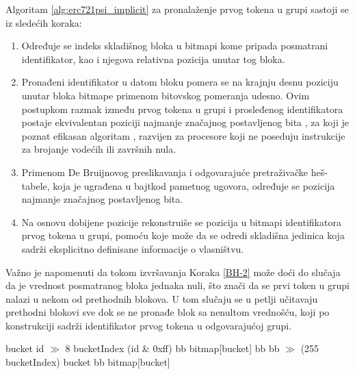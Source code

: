 Algoritam \ref{alg:erc721psi_implicit} za pronalaženje prvog tokena u grupi sastoji se iz sledećih koraka:
\begin{enumerate}
\item Određuje se indeks skladišnog bloka u bitmapi kome pripada posmatrani identifikator, kao i njegova relativna pozicija unutar tog bloka.
\item \label{BH-2} Pronađeni identifikator u datom bloku pomera se na krajnju desnu poziciju unutar bloka bitmape primenom bitovskog pomeranja udesno. Ovim postupkom razmak između prvog tokena u grupi i prosleđenog identifikatora postaje ekvivalentan poziciji najmanje značajnog postavljenog bita , za koji je poznat efikasan algoritam \cite{leiserson1998using}, razvijen za procesore koji ne poseduju instrukcije za brojanje vodećih ili završnih nula.
\item Primenom De Bruijnovog preslikavanja i odgovarajuće pretraživačke heš-tabele, koja je ugrađena u bajtkod pametnog ugovora, određuje se pozicija najmanje značajnog postavljenog bita.
\item Na osnovu dobijene pozicije rekonstruiše se pozicija u bitmapi identifikatora prvog tokena u grupi, pomoću koje može da se odredi skladišna jedinica koja sadrži eksplicitno definisane informacije o vlasništvu.
\end{enumerate}

Važno je napomenuti da tokom izvršavanja Koraka \ref{BH-2} može doći do slučaja da je vrednost posmatranog bloka jednaka nuli, što znači da se prvi token u grupi nalazi u nekom od prethodnih blokova. U tom slučaju se u petlji učitavaju prethodni blokovi sve dok se ne pronađe blok sa nenultom vrednošću, koji po konstrukciji sadrži identifikator prvog tokena u odgovarajućoj grupi.

\begin{algorithm}
\caption{Algoritam za pronalaženje implicitnog vlasništva u ERC-721Psi standardu}
\label{alg:erc721psi_implicit}
\begin{algorithmic}[1]
    \State bucket \Eq id $\gg$ 8
    \State bucketIndex \Eq (id \& 0xff)
    \State bb \Eq bitmap[bucket]\coldSLOAD
    \State bb \Eq bb $\gg$ (255 \Minus bucketIndex)
    \Else
            \State bucket\MinusMinus
            \State bb \Eq bitmap[bucket]\coldSLOAD
            \EndIf
        \EndWhile
    \EndIf

\EndFunction
\end{algorithmic}
\end{algorithm}

